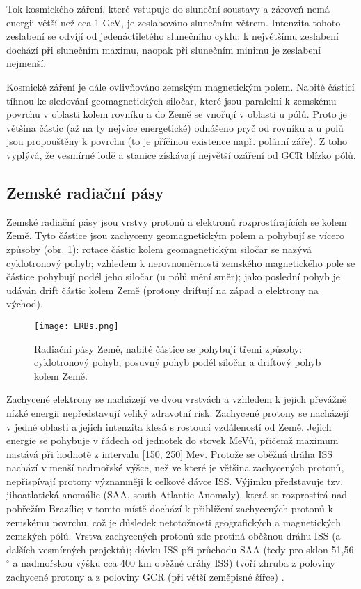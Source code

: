 Tok kosmického záření, které vstupuje do sluneční soustavy a zároveň nemá energii větší než cca 1 GeV, je zeslabováno slunečním větrem. Intenzita tohoto zeslabení se odvíjí od jedenáctiletého slunečního cyklu: k největšímu zeslabení dochází při slunečním maximu, naopak při slunečním minimu je zeslabení nejmenší. 

Kosmické záření je dále ovlivňováno zemským magnetickým polem. Nabité částicí tíhnou ke sledování geomagnetických siločar, které jsou paralelní k zemskému povrchu v oblasti kolem rovníku a do Země se vnořují v oblasti u pólů. Proto je většina částic (až na ty nejvíce energetické) odnášeno pryč od rovníku a u polů jsou propouštěny k povrchu (to je příčinou existence např. polární záře). Z toho vyplývá, že vesmírné lodě a stanice získávají největší ozáření od GCR blízko pólů.

\subsection{Zemské radiační pásy}
Zemské radiační pásy jsou vrstvy protonů a elektronů rozprostírajících se kolem Země. Tyto částice jsou zachyceny geomagnetickým polem a pohybují se vícero způsoby (obr. \ref{fig:ERBs}): rotace částic kolem geomagnetickým siločar se nazývá cyklotronový pohyb; vzhledem k nerovnoměrnosti zemského magnetického pole se částice pohybují podél jeho siločar (u pólů mění směr); jako poslední pohyb je udáván drift částic kolem Země (protony driftují na západ a elektrony na východ).

\begin{figure}[H]
  \centering
  \texttt{[image: ERBs.png]}
  \caption{Radiační pásy Země, nabité částice se pohybují třemi způsoby: cyklotronový pohyb, posuvný pohyb podél siločar a driftový pohyb kolem Země. \cite{benton}}
  \label{fig:ERBs}
\end{figure}

Zachycené elektrony se nacházejí ve dvou vrstvách a vzhledem k jejich převážně nízké energii nepředstavují veliký zdravotní risk. Zachycené protony se nacházejí v jedné oblasti a jejich intenzita klesá s rostoucí vzdáleností od Země. Jejich energie se pohybuje v řádech od jednotek do stovek MeVů, přičemž maximum nastává při hodnotě z intervalu [150, 250] Mev. Protože se oběžná dráha ISS nachází v menší nadmořské výšce, než ve které je většina zachycených protonů, nepřispívají protony významněji k celkové dávce ISS. Výjimku představuje tzv. jihoatlatická anomálie (SAA, south Atlantic Anomaly), která se rozprostírá nad pobřežím Brazílie; v tomto místě dochází k přiblížení zachycených protonů k zemskému povrchu, což je důsledek netotožnosti geografických a magnetických zemských pólů.
Vrstva zachycených protonů zde protíná oběžnou dráhu ISS (a dalších vesmírných projektů); dávku ISS při průchodu SAA (tedy pro sklon 51,56$^\circ$ a nadmořskou výšku cca 400 km oběžné dráhy ISS)  tvoří zhruba z poloviny zachycené protony a z poloviny GCR (při větší zeměpisné šířce) \cite{benton}. 


